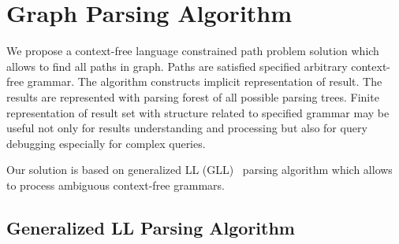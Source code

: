 \section{Graph Parsing Algorithm}
We propose a context-free language constrained path problem solution which allows to find all paths in graph. Paths are satisfied specified arbitrary context-free grammar. The algorithm constructs implicit representation of result. The results are represented with parsing forest of all possible parsing trees. 
Finite representation of result set with structure related to specified grammar may be useful not only for results understanding and processing but also for query debugging especially for complex queries. 

Our solution is based on generalized LL (GLL)~\cite{scott2010gll, FastPracticalGLL} parsing algorithm which allows to process ambiguous context-free grammars.


\subsection{Generalized LL Parsing Algorithm}

